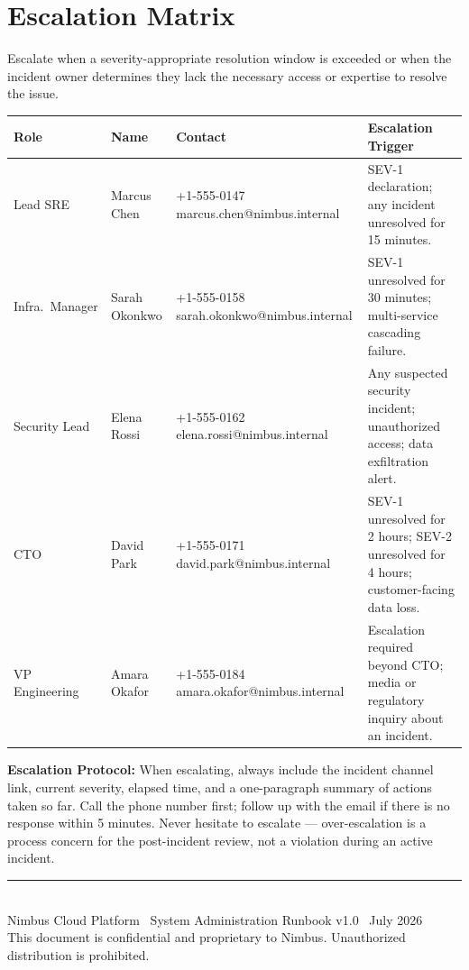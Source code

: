 \section{Escalation Matrix}

Escalate when a severity-appropriate resolution window is exceeded or when the incident owner determines they lack the necessary access or expertise to resolve the issue.

\medskip
{\small
\begin{tabularx}{\textwidth}{>{\raggedright\arraybackslash}p{1.9cm}>{\raggedright\arraybackslash}p{2.1cm}>{\raggedright\arraybackslash}p{5.0cm}>{\raggedright\arraybackslash}X}
\toprule
\textbf{Role} & \textbf{Name} & \textbf{Contact} & \textbf{Escalation Trigger} \\
\midrule
Lead SRE & Marcus Chen & +1-555-0147 \newline marcus.chen@nimbus.internal & SEV-1 declaration; any incident unresolved for 15 minutes. \\
Infra.\ Manager & Sarah Okonkwo & +1-555-0158 \newline sarah.okonkwo@nimbus.internal & SEV-1 unresolved for 30 minutes; multi-service cascading failure. \\
Security Lead & Elena Rossi & +1-555-0162 \newline elena.rossi@nimbus.internal & Any suspected security incident; unauthorized access; data exfiltration alert. \\
CTO & David Park & +1-555-0171 \newline david.park@nimbus.internal & SEV-1 unresolved for 2 hours; SEV-2 unresolved for 4 hours; customer-facing data loss. \\
VP Engineering & Amara Okafor & +1-555-0184 \newline amara.okafor@nimbus.internal & Escalation required beyond CTO; media or regulatory inquiry about an incident. \\
\bottomrule
\end{tabularx}}

\vspace{8pt}
\begin{warningbox}
\textbf{Escalation Protocol:} When escalating, always include the incident channel link, current severity, elapsed time, and a one-paragraph summary of actions taken so far. Call the phone number first; follow up with the email if there is no response within 5 minutes. Never hesitate to escalate --- over-escalation is a process concern for the post-incident review, not a violation during an active incident.
\end{warningbox}

\vfill
\begin{center}
\rule{0.4\textwidth}{0.3pt}\\[6pt]
{\footnotesize\textcolor{mediumgray}{Nimbus Cloud Platform \textbar\ System Administration Runbook v1.0 \textbar\ July 2026}}\\[2pt]
{\footnotesize\textcolor{mediumgray}{This document is confidential and proprietary to Nimbus. Unauthorized distribution is prohibited.}}
\end{center}
